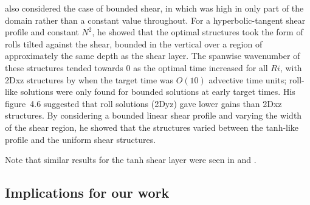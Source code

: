 \documentclass{article}
\begin{document}
\citet{Tearle2004} also considered the case of bounded shear, in which was high in only part of the domain rather than a constant value throughout. For a hyperbolic-tangent shear profile and constant $N^2$, he showed that the optimal structures took the form of rolls tilted against the shear, bounded in the vertical over a region of approximately the same depth as the shear layer. The spanwise wavenumber of these structures tended towards $0$ as the optimal time increased for all $Ri$, with 2Dxz structures by when the target time was $O(10)$ advective time units; roll-like solutions were only found for bounded solutions at early target times. His figure~4.6 suggested that roll solutions (2Dyz) gave lower gains than 2Dxz structures. By considering a bounded linear shear profile and varying the width of the shear region, he showed that the structures varied between the tanh-like profile and the uniform shear structures. 

Note that similar results for the tanh shear layer were seen in \citet{Kaminski2014} and \citet{Kaminski2017}. 

\subsection{Implications for our work}
\end{document}
